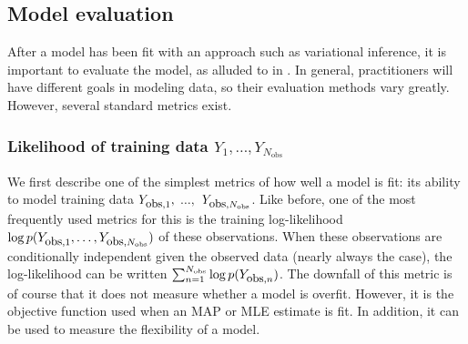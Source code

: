 \subsection{Model evaluation}
After a model has been fit with an approach such as variational
inference, it is important to evaluate the model, as alluded to in
.  In general, practitioners will have
different goals in modeling data, so their evaluation methods vary
greatly.  However, several standard metrics exist.

\subsubsection{Likelihood of training data $Y_1, \ldots, Y_{N_{\mbox{obs}}}$}
We first describe one of the simplest metrics of how well a model is fit:
its ability to model training data $Y_{\mbox{\small obs},1},$
$\ldots,$ $Y_{\mbox{\small obs},N_{\mbox{\tiny obs}}}$.  Like before,
one of the most frequently used metrics for this is the training
log-likelihood $\log p(Y_{\mbox{\small obs},1}, \ldots,
Y_{\mbox{\small obs},N_{\mbox{\tiny obs}}})$ of these
observations. When these observations are conditionally independent
given the observed data (nearly always the case), the log-likelihood
can be written $\sum_{n=1}^{N_{\mbox{\tiny obs}}} \log
p(Y_{\mbox{\small obs},n})$.  The downfall of this metric is of course
that it does not measure whether a model is overfit.  However, it is
the objective function used when an MAP or MLE estimate is
fit.  In addition, it can be used to measure the flexibility of a model.




